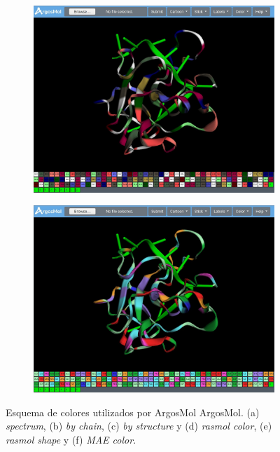 \documentclass{article}
\begin{document}
\begin{figure}[H]
\begin{subfigure}{.5\textwidth}
		\includegraphics[width=.99\linewidth]{img/argosmol/mol10}
		\caption{}
		\label{fig:sfig1}
	\end{subfigure}%
	\begin{subfigure}{.5\textwidth}
		\centering
		\includegraphics[width=.99\linewidth]{img/argosmol/mol11}
		\caption{}
		\label{fig:sfig2}
	\end{subfigure}
	\caption{Esquema de colores utilizados por ArgosMol ArgosMol. (a) \textit{spectrum}, (b) \textit{by chain}, (c) \textit{by structure} y (d) \textit{rasmol color}, (e) \textit{rasmol shape} y (f) \textit{MAE color}. }
	\label{fig:colors}
\end{figure}
\end{document}
